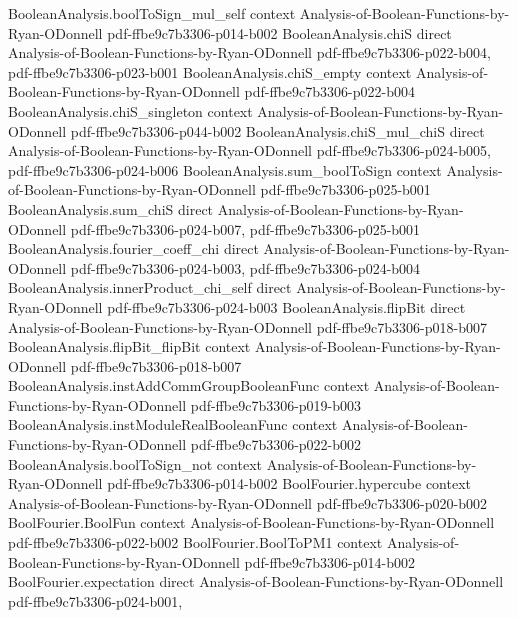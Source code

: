 \begin{lemma}
  {BooleanAnalysis.boolToSign_mul_self}
  {context}
  {Analysis-of-Boolean-Functions-by-Ryan-ODonnell}
  {pdf-ffbe9c7b3306-p014-b002}
\proofstep
  {BooleanAnalysis.chiS}
  {direct}
  {Analysis-of-Boolean-Functions-by-Ryan-ODonnell}
  {pdf-ffbe9c7b3306-p022-b004,
    pdf-ffbe9c7b3306-p023-b001}
\proofstep
  {BooleanAnalysis.chiS_empty}
  {context}
  {Analysis-of-Boolean-Functions-by-Ryan-ODonnell}
  {pdf-ffbe9c7b3306-p022-b004}
\proofstep
  {BooleanAnalysis.chiS_singleton}
  {context}
  {Analysis-of-Boolean-Functions-by-Ryan-ODonnell}
  {pdf-ffbe9c7b3306-p044-b002}
\proofstep
  {BooleanAnalysis.chiS_mul_chiS}
  {direct}
  {Analysis-of-Boolean-Functions-by-Ryan-ODonnell}
  {pdf-ffbe9c7b3306-p024-b005,
    pdf-ffbe9c7b3306-p024-b006}
\proofstep
  {BooleanAnalysis.sum_boolToSign}
  {context}
  {Analysis-of-Boolean-Functions-by-Ryan-ODonnell}
  {pdf-ffbe9c7b3306-p025-b001}
\proofstep
  {BooleanAnalysis.sum_chiS}
  {direct}
  {Analysis-of-Boolean-Functions-by-Ryan-ODonnell}
  {pdf-ffbe9c7b3306-p024-b007,
    pdf-ffbe9c7b3306-p025-b001}
\proofstep
  {BooleanAnalysis.fourier_coeff_chi}
  {direct}
  {Analysis-of-Boolean-Functions-by-Ryan-ODonnell}
  {pdf-ffbe9c7b3306-p024-b003,
    pdf-ffbe9c7b3306-p024-b004}
\proofstep
  {BooleanAnalysis.innerProduct_chi_self}
  {direct}
  {Analysis-of-Boolean-Functions-by-Ryan-ODonnell}
  {pdf-ffbe9c7b3306-p024-b003}
\proofstep
  {BooleanAnalysis.flipBit}
  {direct}
  {Analysis-of-Boolean-Functions-by-Ryan-ODonnell}
  {pdf-ffbe9c7b3306-p018-b007}
\proofstep
  {BooleanAnalysis.flipBit_flipBit}
  {context}
  {Analysis-of-Boolean-Functions-by-Ryan-ODonnell}
  {pdf-ffbe9c7b3306-p018-b007}
\proofstep
  {BooleanAnalysis.instAddCommGroupBooleanFunc}
  {context}
  {Analysis-of-Boolean-Functions-by-Ryan-ODonnell}
  {pdf-ffbe9c7b3306-p019-b003}
\proofstep
  {BooleanAnalysis.instModuleRealBooleanFunc}
  {context}
  {Analysis-of-Boolean-Functions-by-Ryan-ODonnell}
  {pdf-ffbe9c7b3306-p022-b002}
\proofstep
  {BooleanAnalysis.boolToSign_not}
  {context}
  {Analysis-of-Boolean-Functions-by-Ryan-ODonnell}
  {pdf-ffbe9c7b3306-p014-b002}
\proofstep
  {BoolFourier.hypercube}
  {context}
  {Analysis-of-Boolean-Functions-by-Ryan-ODonnell}
  {pdf-ffbe9c7b3306-p020-b002}
\proofstep
  {BoolFourier.BoolFun}
  {context}
  {Analysis-of-Boolean-Functions-by-Ryan-ODonnell}
  {pdf-ffbe9c7b3306-p022-b002}
\proofstep
  {BoolFourier.BoolToPM1}
  {context}
  {Analysis-of-Boolean-Functions-by-Ryan-ODonnell}
  {pdf-ffbe9c7b3306-p014-b002}
\proofstep
  {BoolFourier.expectation}
  {direct}
  {Analysis-of-Boolean-Functions-by-Ryan-ODonnell}
  {pdf-ffbe9c7b3306-p024-b001,
}
\end{lemma}
